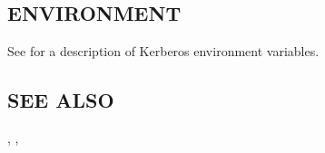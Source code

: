\documentclass[letterpaper,10pt,english]{sphinxmanual}
\begin{document}
\subsection{ENVIRONMENT}
\label{\detokenize{user/user_commands/sclient:environment}}
\sphinxAtStartPar
See {\hyperref[\detokenize{user/user_config/kerberos:kerberos-7}]{}} for a description of Kerberos environment
variables.


\subsection{SEE ALSO}
\label{\detokenize{user/user_commands/sclient:see-also}}
\sphinxAtStartPar
{\hyperref[\detokenize{user/user_commands/kinit:kinit-1}]{}}, , {\hyperref[\detokenize{user/user_config/kerberos:kerberos-7}]{}}



\renewcommand{\indexname}{Index}
\printindex
\end{document}
